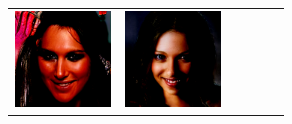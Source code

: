 \documentclass{article}
\newcommand{\pganw}{1.0in}
\begin{document}
\begin{table}[htbp]
\begin{center}
\begin{tabular}{cc|cc|cc}
\includegraphics[width=\pganw]{figures/pgan/2_base_raw_reject.png} &
\includegraphics[width=\pganw]{figures/pgan/3_base_raw_base.png} &

\end{tabular}
\end{center}
\end{table}
\end{document}

